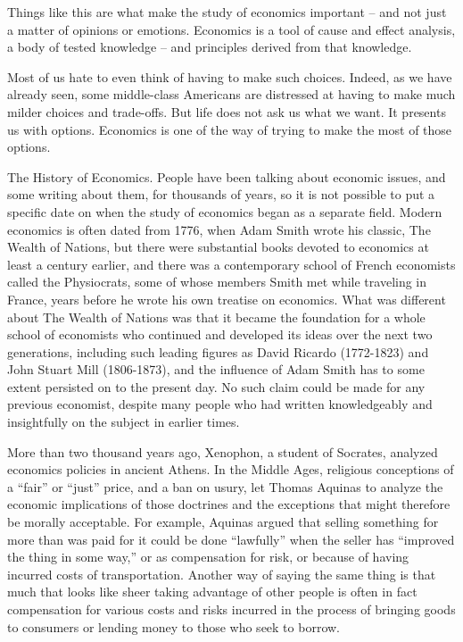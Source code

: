 Things like this are what make the study of economics important – and not just a matter of opinions or emotions. Economics is a tool of cause and effect analysis, a body of tested knowledge – and principles derived from that knowledge.

Most of us hate to even think of having to make such choices. Indeed, as we have already seen, some middle-class Americans are distressed at having to make much milder choices and trade-offs. But life does not ask us what we want. It presents us with options. Economics is one of the way of trying to make the most of those options.

The History of Economics. People have been talking about economic issues, and some writing about them, for thousands of years, so it is not possible to put a specific date on when the study of economics began as a separate field. Modern economics is often dated from 1776, when Adam Smith wrote his classic, The Wealth of Nations, but there were substantial books devoted to economics at least a century earlier, and there was a contemporary school of French economists called the Physiocrats, some of whose members Smith met while traveling in France, years before he wrote his own treatise on economics. What was different about The Wealth of Nations was that it became the foundation for a whole school of economists who continued and developed its ideas over the next two generations, including such leading figures as David Ricardo (1772-1823) and John Stuart Mill (1806-1873), and the influence of Adam Smith has to some extent persisted on to the present day. No such claim could be made for any previous economist, despite many people who had written knowledgeably and insightfully on the subject in earlier times.

More than two thousand years ago, Xenophon, a student of Socrates, analyzed economics policies in ancient Athens. In the Middle Ages, religious conceptions of a ``fair'' or ``just'' price, and a ban on usury, let Thomas Aquinas to analyze the economic implications of those doctrines and the exceptions that might therefore be morally acceptable. For example, Aquinas argued that selling something for more than was paid for it could be done ``lawfully'' when the seller has ``improved the thing in some way,'' or as compensation for risk, or because of having incurred costs of transportation. Another way of saying the same thing is that much that looks like sheer taking advantage of other people is often in fact compensation for various costs and risks incurred in the process of bringing goods to consumers or lending money to those who seek to borrow.

